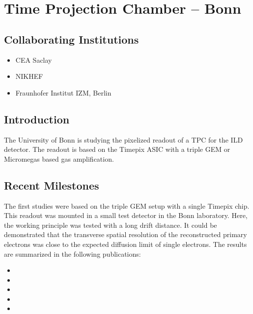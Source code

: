 \section{Time Projection Chamber -- Bonn}
\subsection{Collaborating Institutions}
\begin{itemize}
	\item CEA Saclay
	\item NIKHEF
	\item Fraunhofer Institut IZM, Berlin
\end{itemize}
\subsection{Introduction}
The University of Bonn is studying the pixelized readout of a TPC for the ILD detector. The readout is based on the Timepix ASIC with a triple GEM or Micromegas based gas amplification.

\subsection{Recent Milestones}
The first studies were based on the triple GEM setup with a single Timepix chip. This readout was mounted in a small test detector in the Bonn laboratory. Here, the working principle was tested with a long drift distance. It could be demonstrated that the transverse spatial resolution of the reconstructed primary electrons was close to the expected diffusion limit of single electrons. The results are summarized in the following publications:
\begin{itemize}
\item {}
\item {}
\item {}
\item {}
\item {}
\end{itemize}

